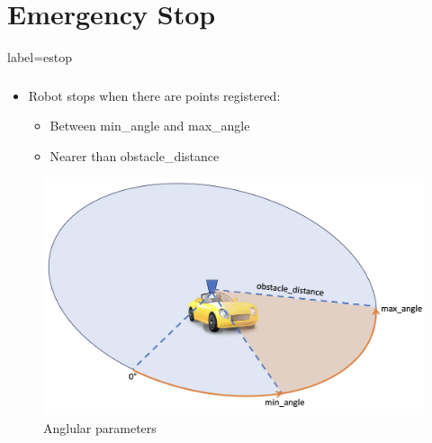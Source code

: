 \documentclass[numberofslides]{AMSBeamer}
\begin{document}
\section{Emergency Stop}
\begin{frame}{label=estop}
    \frametitle{\insertsectionhead}
    \begin{minipage}{0.4\textwidth}
        \begin{itemize}
            \item<1-> Robot stops when there are points registered:
            \begin{itemize}
                \item Between min\_angle and max\_angle
                \item Nearer than obstacle\_distance
            \end{itemize}
        \end{itemize}
    \end{minipage}%
    \begin{minipage}{0.6\textwidth}
    \begin{center}
        \vspace{0.5cm}
        \begin{figure}
            \begin{overprint}
                \includegraphics[width=\textwidth]{Presentations/LaTeX/images/estop-normal.jpeg}
                    \caption{Anglular parameters}

\end{overprint}
\end{figure}
\end{center}
\end{minipage}
\end{frame}
\end{document}
